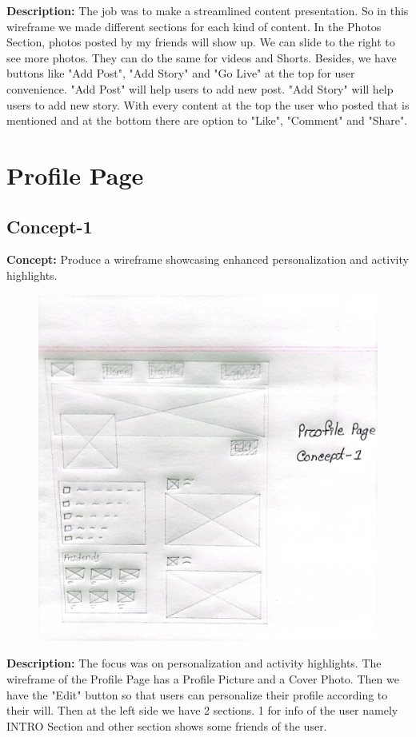 \documentclass{report}
\begin{document}
\textbf{Description: }The job was to make a streamlined content presentation. So in this wireframe we made different sections for each kind of content. In the Photos Section, photos posted by my friends will show up. We can slide to the right to see more photos. They can do the same for videos and Shorts. Besides, we have buttons like "Add Post", "Add Story" and "Go Live" at the top for user convenience. "Add Post" will help users to add new post. "Add Story" will help users to add new story. With every content at the top the user who posted that is mentioned and at the bottom there are option to "Like", "Comment" and "Share".







\newpage




\section{Profile Page}

\subsection{Concept-1}
\textbf{Concept: }Produce a wireframe showcasing enhanced personalization and activity highlights.

\begin{figure}[h]
    \centering
    \includegraphics[width=0.5\linewidth]{5.jpg}
    \label{fig:enter-label}
\end{figure}


\textbf{Description: }The focus was on personalization and activity highlights. The wireframe of the Profile Page has a Profile Picture and a Cover Photo. Then we have the "Edit" button so that users can personalize their profile according to their will. Then at the left side we have 2 sections. 1 for info of the user namely INTRO Section and other section shows some friends of the user.\\
\end{document}
